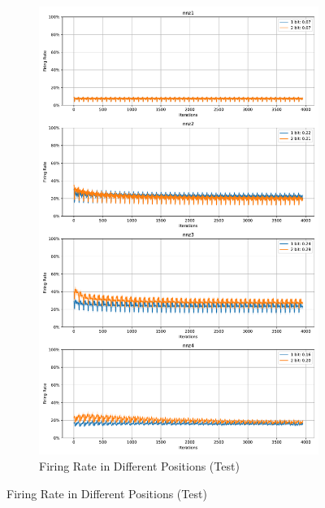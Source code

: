         \begin{figure}[H]
            \centering
            \ContinuedFloat
            \begin{subfigure}[H]{0.8\textwidth}
                \centering
                \includegraphics[width=\textwidth]{../firerate/NMNIST/plots/nmnist_test_firerate.pdf}
                \caption{Firing Rate in Different Positions (Test)}
            \end{subfigure}
        \end{figure}
